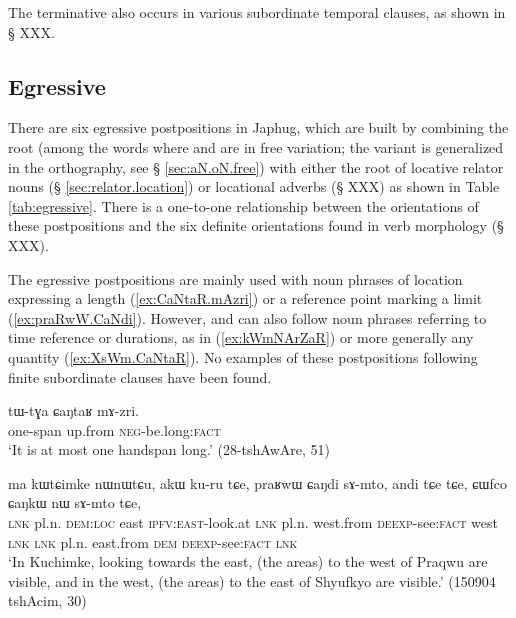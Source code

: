 The terminative also occurs in various subordinate temporal clauses, as shown in § XXX.

\subsection{Egressive} \label{sec:egressive}  
There are six egressive postpositions in Japhug, which are built by combining the root  (among the words where  and  are in free variation; the variant  is generalized in the orthography,  see § \ref{sec:aN.oN.free}) with either the root of locative relator nouns (§ \ref{sec:relator.location}) or locational adverbs (§ XXX) as shown in Table \ref{tab:egressive}. There is a one-to-one relationship between the orientations of these postpositions and the six definite orientations found in verb morphology (§ XXX).

The egressive postpositions are mainly used with noun phrases of location expressing a length (\ref{ex:CaNtaR.mAzri}) or a reference point marking a limit (\ref{ex:praRwW.CaNdi}). However,  and  can also follow noun phrases referring to time reference or durations, as in (\ref{ex:kWmNArZaR}) or more generally any quantity (\ref{ex:XsWm.CaNtaR}). No examples of these postpositions following finite subordinate clauses have been found.

\begin{exe}
\ex \label{ex:CaNtaR.mAzri}
 \gll  tɯ-tɣa ɕaŋtaʁ mɤ-zri. \\
 one-span up.from \textsc{neg}-be.long:\textsc{fact} \\
 \glt `It is at most one handspan long.' (28-tshAwAre, 51)
 \end{exe}
 
\begin{exe}
\ex \label{ex:praRwW.CaNdi}
 \gll ma kɯtɕimke nɯnɯtɕu, akɯ ku-ru tɕe, praʁwɯ ɕaŋdi sɤ-mto, 
andi tɕe tɕe, ɕɯfco ɕaŋkɯ nɯ sɤ-mto tɕe, \\
\textsc{lnk} pl.n. \textsc{dem}:\textsc{loc} east \textsc{ipfv}:\textsc{east}-look.at \textsc{lnk} pl.n. west.from \textsc{deexp}-see:\textsc{fact} west \textsc{lnk} \textsc{lnk} pl.n. east.from \textsc{dem} \textsc{deexp}-see:\textsc{fact} \textsc{lnk} \\
\glt `In Kuchimke, looking towards the east, (the areas) to the west of Praqwu are visible, and in the west, (the areas) to the east of Shyufkyo are visible.' (150904 tshAcim, 30)
\end{exe}

